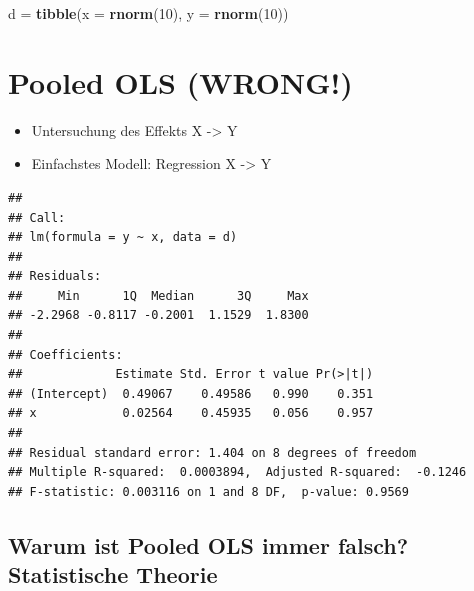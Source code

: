 \documentclass[]{book}
\newenvironment{Shaded}{\begin{snugshade}}{\end{snugshade}}
\newcommand{\DataTypeTok}[1]{\textcolor[rgb]{0.13,0.29,0.53}{#1}}
\newcommand{\DecValTok}[1]{\textcolor[rgb]{0.00,0.00,0.81}{#1}}
\newcommand{\KeywordTok}[1]{\textcolor[rgb]{0.13,0.29,0.53}{\textbf{#1}}}
\newcommand{\NormalTok}[1]{#1}
\newcommand{\OperatorTok}[1]{\textcolor[rgb]{0.81,0.36,0.00}{\textbf{#1}}}
\newcommand{\StringTok}[1]{\textcolor[rgb]{0.31,0.60,0.02}{#1}}
\begin{document}
\begin{Shaded}
\begin{Highlighting}[]
\NormalTok{d =}\StringTok{ }\KeywordTok{tibble}\NormalTok{(}\DataTypeTok{x =} \KeywordTok{rnorm}\NormalTok{(}\DecValTok{10}\NormalTok{), }\DataTypeTok{y =} \KeywordTok{rnorm}\NormalTok{(}\DecValTok{10}\NormalTok{))}
\end{Highlighting}
\end{Shaded}

\hypertarget{pooled-ols-wrong}{%
\section{Pooled OLS (WRONG!)}\label{pooled-ols-wrong}}

\begin{itemize}
\item
  Untersuchung des Effekts X -\textgreater{} Y
\item
  Einfachstes Modell: Regression X -\textgreater{} Y
\end{itemize}

\begin{Shaded}
\end{Shaded}

\begin{verbatim}
## 
## Call:
## lm(formula = y ~ x, data = d)
## 
## Residuals:
##     Min      1Q  Median      3Q     Max 
## -2.2968 -0.8117 -0.2001  1.1529  1.8300 
## 
## Coefficients:
##             Estimate Std. Error t value Pr(>|t|)
## (Intercept)  0.49067    0.49586   0.990    0.351
## x            0.02564    0.45935   0.056    0.957
## 
## Residual standard error: 1.404 on 8 degrees of freedom
## Multiple R-squared:  0.0003894,  Adjusted R-squared:  -0.1246 
## F-statistic: 0.003116 on 1 and 8 DF,  p-value: 0.9569
\end{verbatim}

\hypertarget{warum-ist-pooled-ols-immer-falsch-statistische-theorie}{%
\subsection*{Warum ist Pooled OLS immer falsch? Statistische Theorie}\label{warum-ist-pooled-ols-immer-falsch-statistische-theorie}}
\end{document}
